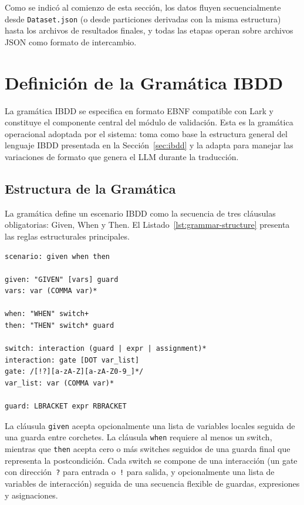 Como se indicó al comienzo de esta sección, los datos fluyen secuencialmente desde \texttt{Dataset.json} (o desde particiones derivadas con la misma estructura) hasta los archivos de resultados finales, y todas las etapas operan sobre archivos JSON como formato de intercambio.

\section{Definición de la Gramática IBDD}
\label{sec:gramatica-implementacion}

La gramática IBDD se especifica en formato EBNF compatible con Lark y constituye el componente central del módulo de validación. Esta es la gramática operacional adoptada por el sistema: toma como base la estructura general del lenguaje IBDD presentada en la Sección~\ref{sec:ibdd} y la adapta para manejar las variaciones de formato que genera el LLM durante la traducción.

\subsection{Estructura de la Gramática}

La gramática define un escenario IBDD como la secuencia de tres cláusulas obligatorias: Given, When y Then. El Listado~\ref{lst:grammar-structure} presenta las reglas estructurales principales.
\begin{samepage}
\begin{center}
\begin{minipage}{0.95\textwidth}
\captionsetup{type=lstlisting}
\caption{Reglas estructurales de la gramática IBDD en Lark}
\label{lst:grammar-structure}
\begin{lstlisting}
scenario: given when then

given: "GIVEN" [vars] guard
vars: var (COMMA var)*

when: "WHEN" switch+
then: "THEN" switch* guard

switch: interaction (guard | expr | assignment)*
interaction: gate [DOT var_list]
gate: /[!?][a-zA-Z][a-zA-Z0-9_]*/
var_list: var (COMMA var)*

guard: LBRACKET expr RBRACKET
\end{lstlisting}
\end{minipage}
\end{center}
\end{samepage}

La cláusula \texttt{given} acepta opcionalmente una lista de variables locales seguida de una guarda entre corchetes. La cláusula \texttt{when} requiere al menos un switch, mientras que \texttt{then} acepta cero o más switches seguidos de una guarda final que representa la postcondición. Cada switch se compone de una interacción (un gate con dirección~\texttt{?} para entrada o~\texttt{!} para salida, y opcionalmente una lista de variables de interacción) seguida de una secuencia flexible de guardas, expresiones y asignaciones.

